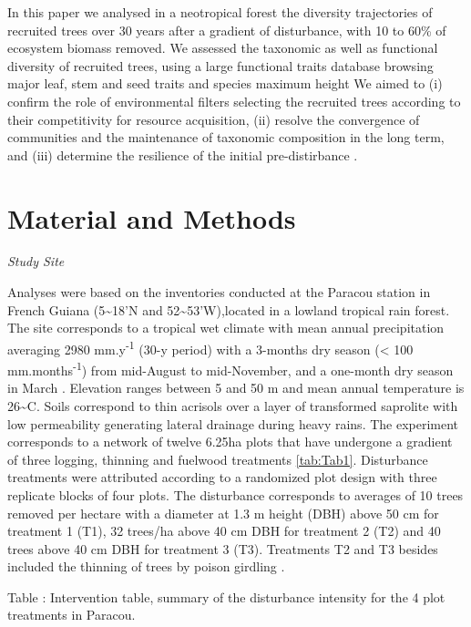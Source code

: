 \documentclass[fleqn,10pt]{ArtEcoFoG} %
\begin{document}
In this paper we analysed in a neotropical forest the diversity
trajectories of recruited trees over 30 years after a gradient of
disturbance, with 10 to 60\% of ecosystem biomass removed. We assessed
the taxonomic as well as functional diversity of recruited trees, using
a large functional traits database browsing major leaf, stem and seed
traits and species maximum height We aimed to (i) confirm the role of
environmental filters selecting the recruited trees according to their
competitivity for resource acquisition, (ii) resolve the convergence of
communities and the maintenance of taxonomic composition in the long
term, and (iii) determine the resilience of the initial pre-distirbance
.

\section{Material and Methods}\label{material-and-methods}

\emph{Study Site}

Analyses were based on the inventories conducted at the Paracou station
in French Guiana (5\textasciitilde{}18'N and
52\textasciitilde{}53'W),located in a lowland tropical rain forest. The
site corresponds to a tropical wet climate with mean annual
precipitation averaging 2980 mm.y\textsuperscript{-1} (30-y period) with
a 3-months dry season (\textless{} 100 mm.months\textsuperscript{-1})
from mid-August to mid-November, and a one-month dry season in March
\citep{Wagner2011}. Elevation ranges between 5 and 50 m and mean annual
temperature is 26\textasciitilde{}C. Soils correspond to thin acrisols
over a layer of transformed saprolite with low permeability generating
lateral drainage during heavy rains. The experiment corresponds to a
network of twelve 6.25ha plots that have undergone a gradient of three
logging, thinning and fuelwood treatments \ref{tab:Tab1}. Disturbance
treatments were attributed according to a randomized plot design with
three replicate blocks of four plots. The disturbance corresponds to
averages of 10 trees removed per hectare with a diameter at 1.3 m height
(DBH) above 50 cm for treatment 1 (T1), 32 trees/ha above 40 cm DBH for
treatment 2 (T2) and 40 trees above 40 cm DBH for treatment 3 (T3).
Treatments T2 and T3 besides included the thinning of trees by poison
girdling \citep{Blanc2009}.

Table : \label{tab:Tab1} Intervention table, summary of the disturbance
intensity for the 4 plot treatments in Paracou.
\end{document}
